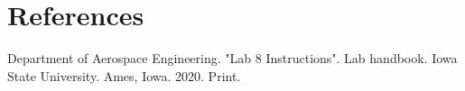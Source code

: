 \section{References}
Department of Aerospace Engineering. "Lab 8 Instructions". Lab handbook. Iowa State University. Ames, Iowa. 2020. Print.
\newline